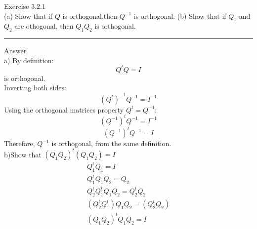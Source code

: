 \documentclass[12pt]{article}
\begin{document}
Exercise $3.2.1$\\

(a) Show that if $Q$ is orthogonal,then $Q^{-1}$ is orthogonal. (b) Show that if $Q_1$ and $Q_2$ are othogonal, then $Q_1Q_2$ is orthogonal.

\noindent\rule{\textwidth}{1pt}

Answer\\

a) By definition: 
$$Q^tQ = I$$
is orthogonal.\\
Inverting both sides: 
$$(Q^t)^{-1}Q^{-1} = I^{-1}$$
Using the orthogonal matrices property $Q^t = Q^{-1}$:
$$(Q^{-1})^tQ^{-1} = I^{-1}$$
$$(Q^{-1})^tQ^{-1} = I$$
Therefore, $Q^{-1}$ is orthogonal, from the same definition.\\

b)Show that $(Q_1Q_2)^t(Q_1Q_2) = I$
\begin{equation*}
\begin{gathered}
Q_1^tQ_1 = I\\
Q_1^tQ_1Q_2 = Q_2\\
Q_2^tQ_1^tQ_1Q_2 = Q_2^tQ_2\\
(Q_2^tQ_1^t)Q_1Q_2 = (Q_2^tQ_2)\\
(Q_1Q_2)^tQ_1Q_2 = I\\
\end{gathered}
\end{equation*}
\end{document}
